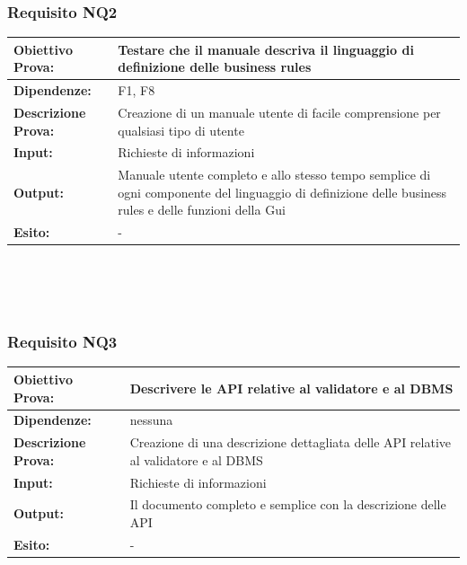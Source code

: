 \documentclass[11pt,titlepage,a4paper]{report}
\begin{document}
\subsubsection{Requisito NQ2}
\begin{tabular}{||p{4.5cm}||p{7.5cm}||}
\hline
{\textbf {Obiettivo Prova:}}& Testare che il manuale descriva il linguaggio di definizione delle business rules \\ \hline
{\textbf{Dipendenze:}}&  F1, F8 \\ \hline
{\textbf{Descrizione Prova:}}&  Creazione di un manuale utente di facile comprensione per qualsiasi tipo di utente \\ \hline
{\textbf{Input:}}&  Richieste di informazioni \\ \hline  
{\textbf{Output:}}& Manuale utente completo e allo stesso tempo semplice di ogni componente del linguaggio di definizione delle business rules e delle funzioni della Gui \\ \hline
{\textbf{Esito:}}& - \\ \hline
\end{tabular} \\
\\
\\
\subsubsection{Requisito NQ3}
\begin{tabular}{||p{4.5cm}||p{7.5cm}||}
\hline
{\textbf {Obiettivo Prova:}}& Descrivere le API relative al validatore e al DBMS\\ \hline
{\textbf{Dipendenze:}}& nessuna \\ \hline
{\textbf{Descrizione Prova:}}&  Creazione di una descrizione dettagliata delle API relative al validatore e al DBMS\\ \hline
{\textbf{Input:}}&  Richieste di informazioni \\ \hline  
{\textbf{Output:}}& Il documento completo e semplice con la descrizione delle API  \\ \hline
{\textbf{Esito:}}& - \\ \hline
\end{tabular} \\
\end{document}
